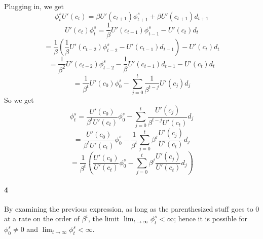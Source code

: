 \documentclass[10pt,letter]{article}
\newcommand{\problempart}[1]{\paragraph{#1}}
\begin{document}
Plugging in, we get
\[ \phi_t^s U'(c_t) = \beta U'(c_{t+1})\phi_{t+1}^s + \beta U'(c_{t+1})d_{t+1} \]
\[  U'(c_{t})\phi_{t}^s  = \frac{1}{\beta} U'(c_{t-1})\phi_{t-1}^s - U'(c_{t})d_{t}\]
\[    = \frac{1}{\beta} \left(\frac{1}{\beta} U'(c_{t-2})\phi_{t-2}^s - U'(c_{t-1})d_{t-1} \right) - U'(c_{t})d_{t}\]
\[    = \frac{1}{\beta^2}U'(c_{t-2})\phi_{t-2}^s - \frac{1}{\beta} U'(c_{t-1})d_{t-1}  - U'(c_{t})d_{t}\]
\[    = \frac{1}{\beta^t}U'(c_{0})\phi_{0}^s - \sum_{j=0}^t \frac{1}{\beta^{t-j}} U'(c_{j})d_{j} \]
So we get
\[ \phi_t^s = \frac{U'(c_{0})}{\beta^tU'(c_{t})}\phi_{0}^s - \sum_{j=0}^t \frac{U'(c_{j})}{\beta^{t-j} U'(c_{t})} d_{j} \]
\[  = \frac{U'(c_{0})}{\beta^tU'(c_{t})}\phi_{0}^s - \frac{1}{\beta^t}\sum_{j=0}^t \beta^j \frac{U'(c_{j})}{ U'(c_{t})} d_{j} \]
\[  = \frac{1}{\beta^t}\left( \frac{U'(c_{0})}{U'(c_{t})}\phi_{0}^s - \sum_{j=0}^t \beta^j \frac{U'(c_{j})}{ U'(c_{t})} d_{j} \right) \]
\problempart{4}
By examining the previous expression, as long as the parenthesized stuff goes to 0 at a rate on the order of $\beta^t$, the limit $\lim_{t\to\infty} \phi_t^s < \infty$; hence it is possible for $\phi_0^s \neq 0$ and $\lim_{t\to\infty} \phi_t^s < \infty$.
\end{document}
